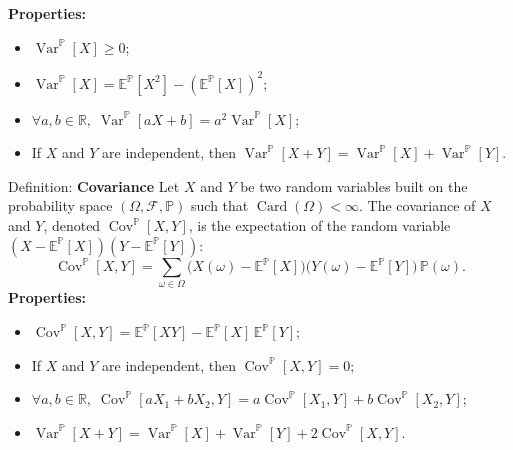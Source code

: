 \documentclass[12pt,a4paper]{article}
\begin{document}
\textbf{Properties:}
\begin{itemize}
	\item[V1] $\operatorname{Var}^{\mathbb{P}}[X] \ge 0$;
	\item[V2] $\operatorname{Var}^{\mathbb{P}}[X] = \mathbb{E}^{\mathbb{P}}[X^2] - \left(\mathbb{E}^{\mathbb{P}}[X]\right)^2$;
	\item[V3] $\forall a,b \in \mathbb{R},\; \operatorname{Var}^{\mathbb{P}}[aX + b] = a^2\operatorname{Var}^{\mathbb{P}}[X]$;
	\item[V4] If $X$ and $Y$ are independent, then $\operatorname{Var}^{\mathbb{P}}[X + Y] = \operatorname{Var}^{\mathbb{P}}[X] + \operatorname{Var}^{\mathbb{P}}[Y]$.
\end{itemize}
\vspace{1em}


Definition: \textbf{Covariance}
Let $X$ and $Y$ be two random variables built on the probability space $(\Omega, \mathcal{F}, \mathbb{P})$ such that $\operatorname{Card}(\Omega) < \infty$. The covariance of $X$ and $Y$, denoted $\operatorname{Cov}^{\mathbb{P}}[X,Y]$, is the expectation of the random variable $(X - \mathbb{E}^{\mathbb{P}}[X])(Y - \mathbb{E}^{\mathbb{P}}[Y])$:
\[
\operatorname{Cov}^{\mathbb{P}}[X,Y] = \sum_{\omega \in \Omega} \bigl(X(\omega) - \mathbb{E}^{\mathbb{P}}[X]\bigr)\bigl(Y(\omega) - \mathbb{E}^{\mathbb{P}}[Y]\bigr)\,\mathbb{P}(\omega).
\]
\vspace{1em}
\textbf{Properties:}
\begin{itemize}
	\item[C1] $\operatorname{Cov}^{\mathbb{P}}[X,Y] = \mathbb{E}^{\mathbb{P}}[XY] - \mathbb{E}^{\mathbb{P}}[X]\,\mathbb{E}^{\mathbb{P}}[Y]$;
	\item[C2] If $X$ and $Y$ are independent, then $\operatorname{Cov}^{\mathbb{P}}[X,Y] = 0$;
	\item[C3] $\forall a,b \in \mathbb{R},\; \operatorname{Cov}^{\mathbb{P}}[aX_1 + bX_2, Y] = a\operatorname{Cov}^{\mathbb{P}}[X_1,Y] + b\operatorname{Cov}^{\mathbb{P}}[X_2,Y]$;
	\item[C4] $\operatorname{Var}^{\mathbb{P}}[X + Y] = \operatorname{Var}^{\mathbb{P}}[X] + \operatorname{Var}^{\mathbb{P}}[Y] + 2\operatorname{Cov}^{\mathbb{P}}[X,Y]$.
\end{itemize}
\vspace{1em}
\end{document}
